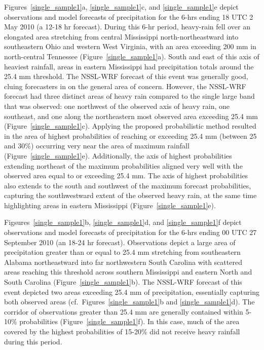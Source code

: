 \mbox{Figures \ref{single_sample1}a}, \mbox{\ref{single_sample1}c}, and \mbox{\ref{single_sample1}e} depict observations and model forecasts of precipitation for the 6-hrs ending 18 UTC 2 May 2010 (a 12-18 hr forecast).
During this 6-hr period, heavy-rain fell over an elongated area stretching from central Mississippi north-northeastward into southeastern Ohio and western West Virginia, with an area exceeding 200 mm in north-central Tennessee \mbox{(Figure \ref{single_sample1}a)}.
South and east of this axis of heaviest rainfall, areas in eastern Mississippi had precipitation totals around the 25.4 mm threshold.
The NSSL-WRF forecast of this event was generally good, cluing forecasters in on the general area of concern.
However, the NSSL-WRF forecast had three distinct areas of heavy rain compared to the single large band that was observed: one northwest of the observed axis of heavy rain, one southeast, and one along the northeastern most observed area exceeding 25.4 mm \mbox{(Figure \ref{single_sample1}c)}.
Applying the proposed probabilistic method resulted in the area of highest probabilities of reaching or exceeding 25.4 mm (between 25 and 30\%) occurring very near the area of maximum rainfall \mbox{(Figure \ref{single_sample1}e)}.
Additionally, the axis of highest probabilities extending northeast of the maximum probabilities aligned very well with the observed area equal to or exceeding 25.4 mm.
The axis of highest probabilities also extends to the south and southwest of the maximum forecast probabilities, capturing the southwestward extent of the observed heavy rain, at the same time highlighting areas in eastern Mississippi \mbox{(Figure \ref{single_sample1}e)}.


\mbox{Figsures \ref{single_sample1}b}, \mbox{\ref{single_sample1}d}, and \mbox{\ref{single_sample1}f} depict observations and model forecasts of precipitation for the 6-hrs ending 00 UTC 27 September 2010 (an 18-24 hr forecast).
Observations depict a large area of precipitation greater than or equal to 25.4 mm stretching from southeastern Alabama northeastward into far northwestern South Carolina with scattered areas reaching this threshold across southern Mississippi and eastern North and South Carolina \mbox{(Figure \ref{single_sample1}b)}.
The NSSL-WRF forecast of this event depicted two areas exceeding 25.4 mm of precipitation, essentially capturing both observed areas (\mbox{cf. Figures \ref{single_sample1}b} and \mbox{\ref{single_sample1}d)}.
The corridor of observations greater than 25.4 mm are generally contained within 5-10\% probabilities \mbox{(Figure \ref{single_sample1}f)}. In this case, much of the area covered by the highest probabilities of 15-20\% did not receive heavy rainfall during this period.



